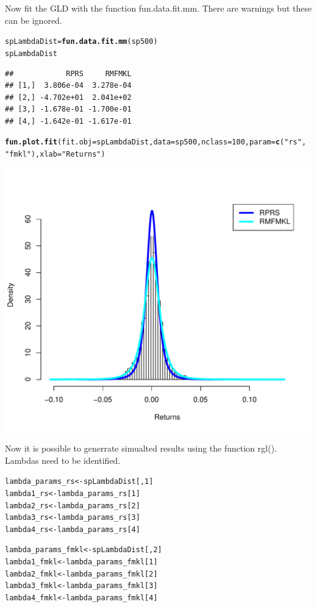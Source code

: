 \documentclass[12pt, a4paper, oneside]{article}\usepackage{graphicx, color}
\makeatletter
\def\maxwidth{ %
  \ifdim\Gin@nat@width>\linewidth
    \linewidth
  \else
    \Gin@nat@width
  \fi
}
\newcommand{\hlfunctioncall}[1]{\textcolor[rgb]{0.501960784313725,0,0.329411764705882}{\textbf{#1}}}%
\newcommand{\hlstring}[1]{\textcolor[rgb]{0.6,0.6,1}{#1}}%
\newenvironment{kframe}{%
 \def\at@end@of@kframe{}%
 \ifinner\ifhmode%
  \def\at@end@of@kframe{\end{minipage}}%
  \begin{minipage}{\columnwidth}%
 \fi\fi%
 \def\FrameCommand##1{\hskip\@totalleftmargin \hskip-\fboxsep
 \colorbox{shadecolor}{##1}\hskip-\fboxsep
     \hskip-\linewidth \hskip-\@totalleftmargin \hskip\columnwidth}%
 \MakeFramed {\advance\hsize-\width
   \@totalleftmargin\z@ \linewidth\hsize
   \@setminipage}}%
 {\par\unskip\endMakeFramed%
 \at@end@of@kframe}
\newenvironment{knitrout}{}{} %
\makeatother
\begin{document}
Now fit the GLD with the function fun.data.fit.mm. There are warnings but these can be ignored. 

\begin{knitrout}
\color{fgcolor}\begin{kframe}
\begin{alltt}
spLambdaDist = \hlfunctioncall{fun.data.fit.mm}(sp500)
spLambdaDist
\end{alltt}
\begin{verbatim}
##            RPRS     RMFMKL
## [1,]  3.806e-04  3.278e-04
## [2,] -4.702e+01  2.041e+02
## [3,] -1.678e-01 -1.700e-01
## [4,] -1.642e-01 -1.617e-01
\end{verbatim}
\begin{alltt}
\hlfunctioncall{fun.plot.fit}(fit.obj = spLambdaDist, data = sp500, nclass = 100, param = \hlfunctioncall{c}(\hlstring{"rs"}, 
    \hlstring{"fmkl"}), xlab = \hlstring{"Returns"})
\end{alltt}
\end{kframe}
\includegraphics[width=\maxwidth]{figure/GLD} 

\end{knitrout}

Now it is possible to generrate simualted results using the function rgl(). Lambdas need to be identified. 
\begin{knitrout}
\color{fgcolor}\begin{kframe}
\begin{alltt}
lambda_params_rs <- spLambdaDist[, 1]
lambda1_rs <- lambda_params_rs[1]
lambda2_rs <- lambda_params_rs[2]
lambda3_rs <- lambda_params_rs[3]
lambda4_rs <- lambda_params_rs[4]

lambda_params_fmkl <- spLambdaDist[, 2]
lambda1_fmkl <- lambda_params_fmkl[1]
lambda2_fmkl <- lambda_params_fmkl[2]
lambda3_fmkl <- lambda_params_fmkl[3]
lambda4_fmkl <- lambda_params_fmkl[4]
\end{alltt}
\end{kframe}
\end{knitrout}
\end{document}

